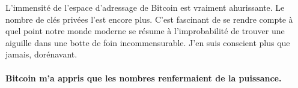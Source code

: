 L'immensité de l'espace d'adressage de Bitcoin est vraiment ahurissante. Le
nombre de clés privées l'est encore plus. C'est fascinant de se rendre compte à
quel point notre monde moderne se résume à l'improbabilité de trouver une
aiguille dans une botte de foin incommensurable. J'en suis conscient plus que
jamais, dorénavant.

\paragraph{Bitcoin m'a appris que les nombres renfermaient de la puissance.}

%
%
%
%
